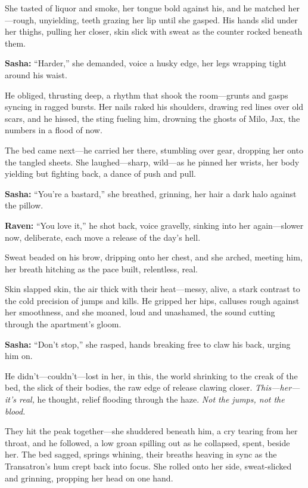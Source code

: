 \documentclass[12pt]{book}
\begin{document}
She tasted of liquor and smoke, her tongue bold against his, and he matched her—rough, unyielding, teeth grazing her lip until she gasped. His hands slid under her thighs, pulling her closer, skin slick with sweat as the counter rocked beneath them.

\vspace{0.5em}
\textbf{Sasha:} “Harder,” she demanded, voice a husky edge, her legs wrapping tight around his waist.

He obliged, thrusting deep, a rhythm that shook the room—grunts and gasps syncing in ragged bursts. Her nails raked his shoulders, drawing red lines over old scars, and he hissed, the sting fueling him, drowning the ghosts of Milo, Jax, the numbers in a flood of now.

The bed came next—he carried her there, stumbling over gear, dropping her onto the tangled sheets. She laughed—sharp, wild—as he pinned her wrists, her body yielding but fighting back, a dance of push and pull.

\vspace{0.5em}
\textbf{Sasha:} “You’re a bastard,” she breathed, grinning, her hair a dark halo against the pillow.

\vspace{0.5em}
\textbf{Raven:} “You love it,” he shot back, voice gravelly, sinking into her again—slower now, deliberate, each move a release of the day’s hell.

Sweat beaded on his brow, dripping onto her chest, and she arched, meeting him, her breath hitching as the pace built, relentless, real.

Skin slapped skin, the air thick with their heat—messy, alive, a stark contrast to the cold precision of jumps and kills. He gripped her hips, calluses rough against her smoothness, and she moaned, loud and unashamed, the sound cutting through the apartment’s gloom.

\vspace{0.5em}
\textbf{Sasha:} “Don’t stop,” she rasped, hands breaking free to claw his back, urging him on.

He didn’t—couldn’t—lost in her, in this, the world shrinking to the creak of the bed, the slick of their bodies, the raw edge of release clawing closer. \textit{This—her—it’s real,} he thought, relief flooding through the haze. \textit{Not the jumps, not the blood.}

They hit the peak together—she shuddered beneath him, a cry tearing from her throat, and he followed, a low groan spilling out as he collapsed, spent, beside her. The bed sagged, springs whining, their breaths heaving in sync as the Transatron’s hum crept back into focus. She rolled onto her side, sweat-slicked and grinning, propping her head on one hand.
\end{document}
